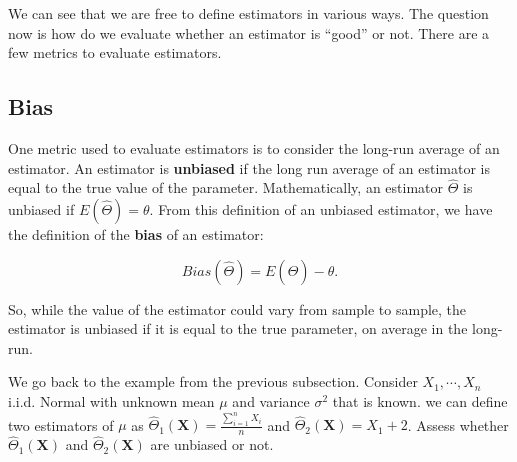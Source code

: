 \documentclass[
]{book}
\begin{document}
We can see that we are free to define estimators in various ways. The question now is how do we evaluate whether an estimator is ``good'' or not. There are a few metrics to evaluate estimators.

\hypertarget{bias}{%
\subsection{Bias}\label{bias}}

One metric used to evaluate estimators is to consider the long-run average of an estimator. An estimator is \textbf{unbiased} if the long run average of an estimator is equal to the true value of the parameter. Mathematically, an estimator \(\hat{\Theta}\) is unbiased if \(E(\hat{\Theta}) = \theta\). From this definition of an unbiased estimator, we have the definition of the \textbf{bias} of an estimator:

\begin{equation} 
Bias(\hat{\Theta}) = E(\hat{\Theta}) - \theta.
\label{eq:7-bias}
\end{equation}

So, while the value of the estimator could vary from sample to sample, the estimator is unbiased if it is equal to the true parameter, on average in the long-run.

We go back to the example from the previous subsection. Consider \(X_1, \cdots, X_n\) i.i.d. Normal with unknown mean \(\mu\) and variance \(\sigma^2\) that is known. we can define two estimators of \(\mu\) as \(\hat{\Theta}_1(\boldsymbol{X}) = \frac{\sum_{i=1}^n X_i}{n}\) and \(\hat{\Theta}_2(\boldsymbol{X}) = X_1 + 2\). Assess whether \(\hat{\Theta}_1(\boldsymbol{X})\) and \(\hat{\Theta}_2(\boldsymbol{X})\) are unbiased or not.
\end{document}
